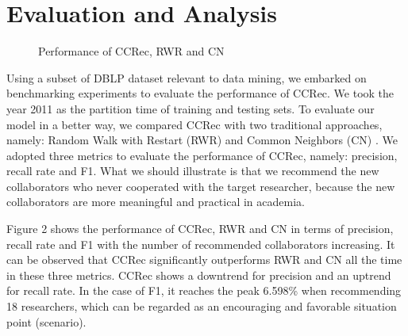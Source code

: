\documentclass{chi-ext}
\begin{document}
\section{Evaluation and Analysis}
\begin{figure}
\centering
{}
\caption{Performance of CCRec, RWR and CN}
\label{fig:5}       %
\end{figure}
Using a subset of DBLP dataset relevant to data mining, we embarked on benchmarking experiments to evaluate the performance of CCRec. We took the year 2011 as the partition time of training and testing sets. To evaluate our model in a better way, we compared CCRec with two traditional approaches, namely: Random Walk with Restart (RWR) and Common Neighbors (CN) \cite{li2014acrec}. We adopted three metrics to evaluate the performance of CCRec, namely: precision, recall rate and F1. What we should illustrate is that we recommend the new collaborators who never cooperated with the target researcher, because the new collaborators are more meaningful and practical in academia.

Figure 2 shows the performance of CCRec, RWR and CN in terms of precision, recall rate and F1 with the number of recommended collaborators increasing. It can be observed that CCRec significantly outperforms RWR and CN all the time in these three metrics. CCRec shows a downtrend for precision and an uptrend for recall rate. In the case of F1, it reaches the peak 6.598\% when recommending 18 researchers, which can be regarded as an encouraging and favorable situation point (scenario).
\end{document}
